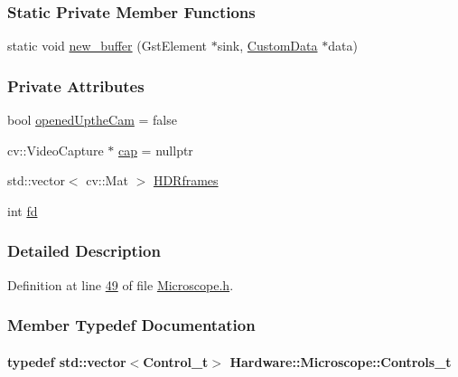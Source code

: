 \subsubsection*{Static Private Member Functions}
\begin{DoxyCompactItemize}
\item 
static void \hyperlink{class_hardware_1_1_microscope_a857987ccdcdb8d6b3cb9545eb7a616e8}{new\+\_\+buffer} (Gst\+Element $\ast$sink, \hyperlink{class_hardware_1_1_microscope_aba8ff1662f7d8a74e4aca943ccce7df4}{Custom\+Data} $\ast$data)
\end{DoxyCompactItemize}
\subsubsection*{Private Attributes}
\begin{DoxyCompactItemize}
\item 
bool \hyperlink{class_hardware_1_1_microscope_ab1033afe167ab113639ea90c6b66544f}{opened\+Upthe\+Cam} = false
\item 
cv\+::\+Video\+Capture $\ast$ \hyperlink{class_hardware_1_1_microscope_a80c5ad94099d7b9d175e1a1cd4179fcd}{cap} = nullptr
\item 
std\+::vector$<$ cv\+::\+Mat $>$ \hyperlink{class_hardware_1_1_microscope_a2c73db8010320428db3fd41d840dd0eb}{H\+D\+Rframes}
\item 
int \hyperlink{class_hardware_1_1_microscope_a2ca84cff524b286b3fb452c4bd813303}{fd}
\end{DoxyCompactItemize}


\subsubsection{Detailed Description}


Definition at line \hyperlink{_microscope_8h_source_l00049}{49} of file \hyperlink{_microscope_8h_source}{Microscope.\+h}.



\subsubsection{Member Typedef Documentation}
\hypertarget{class_hardware_1_1_microscope_a6e46a385288c3e0a8d9866fc8e147b09}{}
\paragraph[{Controls\+\_\+t}]{\setlength{\rightskip}{0pt plus 5cm}typedef std\+::vector$<${\bf Control\+\_\+t}$>$ {\bf Hardware\+::\+Microscope\+::\+Controls\+\_\+t}}\label{class_hardware_1_1_microscope_a6e46a385288c3e0a8d9866fc8e147b09}


